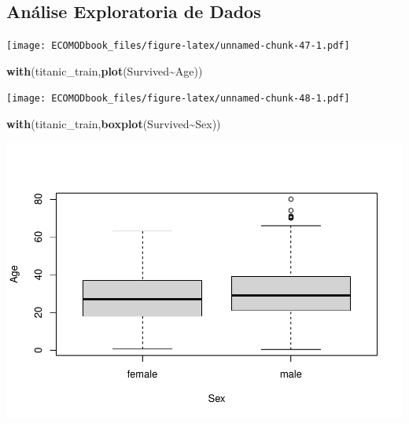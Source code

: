 \documentclass[
]{book}
\newenvironment{Shaded}{\begin{snugshade}}{\end{snugshade}}
\newcommand{\FunctionTok}[1]{\textcolor[rgb]{0.13,0.29,0.53}{\textbf{#1}}}
\newcommand{\NormalTok}[1]{#1}
\newcommand{\SpecialCharTok}[1]{\textcolor[rgb]{0.81,0.36,0.00}{\textbf{#1}}}
\begin{document}
\subsection{Análise Exploratoria de Dados}\label{anuxe1lise-exploratoria-de-dados}

\begin{Shaded}
\end{Shaded}

\texttt{[image: ECOMODbook\_files/figure-latex/unnamed-chunk-47-1.pdf]}

\begin{Shaded}
\begin{Highlighting}[]
\FunctionTok{with}\NormalTok{(titanic\_train,}\FunctionTok{plot}\NormalTok{(Survived}\SpecialCharTok{\textasciitilde{}}\NormalTok{Age))}
\end{Highlighting}
\end{Shaded}

\texttt{[image: ECOMODbook\_files/figure-latex/unnamed-chunk-48-1.pdf]}

\begin{Shaded}
\begin{Highlighting}[]
\FunctionTok{with}\NormalTok{(titanic\_train,}\FunctionTok{boxplot}\NormalTok{(Survived}\SpecialCharTok{\textasciitilde{}}\NormalTok{Sex))}
\end{Highlighting}
\end{Shaded}

\includegraphics{ECOMODbook_files/figure-latex/unnamed-chunk-49-1.pdf}
\end{document}
